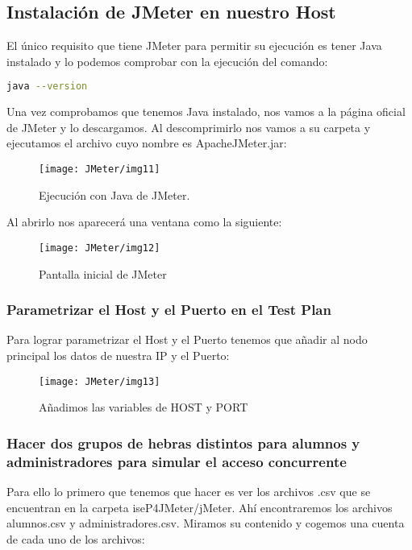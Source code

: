 \subsection{Instalación de JMeter en nuestro Host}

El único requisito que tiene JMeter para permitir su ejecución es tener Java instalado y lo podemos comprobar con la ejecución del comando:

\begin{lstlisting}[language=bash]
    java --version
\end{lstlisting}

Una vez comprobamos que tenemos Java instalado, nos vamos a la página oficial de JMeter y lo descargamos. Al descomprimirlo nos vamos a su carpeta y ejecutamos el archivo cuyo nombre es ApacheJMeter.jar:

\begin{figure}[H]
    \centering
    \texttt{[image: JMeter/img11]}
    \caption{Ejecución con Java de JMeter.}
\end{figure}

Al abrirlo nos aparecerá una ventana como la siguiente:

\begin{figure}[H]
    \centering
    \texttt{[image: JMeter/img12]}
    \caption{Pantalla inicial de JMeter}
\end{figure}

\subsubsection{Parametrizar el Host y el Puerto en el Test Plan}

Para lograr parametrizar el Host y el Puerto tenemos que añadir al nodo principal los datos de nuestra IP y el Puerto:

\begin{figure}[H]
    \centering
    \texttt{[image: JMeter/img13]}
    \caption{Añadimos las variables de HOST y PORT}
\end{figure}

\newpage
\subsubsection{Hacer dos grupos de hebras distintos para alumnos y administradores para simular el acceso concurrente}

Para ello lo primero que tenemos que hacer es ver los archivos .csv que se encuentran en la carpeta iseP4JMeter/jMeter. Ahí encontraremos los archivos alumnos.csv y administradores.csv. Miramos su contenido y cogemos una cuenta de cada uno de los archivos:

